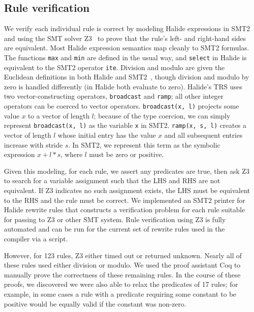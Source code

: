 \documentclass[acmsmall,review,anonymous]{acmart}\settopmatter{printfolios=true,printccs=false,printacmref=false}
\newcommand{\NumPredicatesRelaxed}{{\color{black} 17}\xspace}
\begin{document}
\subsection{Rule verification}

We verify each individual rule is correct by modeling Halide
expressions in SMT2 and using the SMT solver Z3~\cite{de2008z3} to
prove that the rule's left- and right-hand sides are equivalent. Most Halide expression
semantics map cleanly to SMT2 formulas. The functions \texttt{max} and
\texttt{min} are defined in the usual way, and \texttt{select} in
Halide is equivalent to the SMT2 operator \texttt{ite}. Division and
modulo are given the Euclidean definitions in both Halide and
SMT2~\cite{boute1992euclidean}, though division and modulo by zero is handled
differently (in Halide both evaluate to zero).
Halide's TRS uses two vector-constructing operators, \texttt{broadcast} and \texttt{ramp}; all
other integer operators can be coerced to vector operators. 
\texttt{broadcast(x, l)} projects some value $x$ to a vector of length $l$; because of
the type coercion, we can simply represent \texttt{broadcast(x, l)} as the variable
\texttt{x} in SMT2. \texttt{ramp(x, s, l)} creates a vector of length $l$
whose initial entry has the value $x$ and all subsequent entries increase with
stride $s$. In SMT2, we represent this term as the symbolic expression $x + l *
s$, where $l$ must be zero or positive.

Given this modeling, for each rule, we assert any predicates are true, then
ask Z3 to search for a variable assignment such that the LHS and RHS are not
equivalent.  If Z3 indicates no such assignment exists, the LHS must be equivalent to
the RHS and the rule must be correct. We implemented an SMT2 printer for 
Halide rewrite rules that constructs a verification problem for each rule
suitable for passing to Z3 or other SMT system.  Rule verification using Z3 is fully automated
and can be run for the current set of rewrite rules used in the compiler via a script.

However, for 123
rules, Z3 either timed out or returned unknown. Nearly all of these rules used
either division or modulo. We used the proof assistant Coq to manually prove the
correctness of these remaining rules. In the course of these proofs, we
discovered we were also able to relax the predicates of \NumPredicatesRelaxed
rules; for example, in some cases a rule
with a predicate requiring some constant to be positive would be equally valid
if the constant was non-zero.
\end{document}
